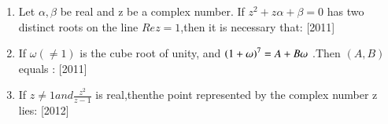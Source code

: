 \documentclass[journal,12pt,twocolumn,article]{IEEEtran}
\theoremstyle{remark}
\begin{document}
\begin{enumerate}[start = 14]
\item Let $\alpha,\beta$ be real and z be a complex number. If $z^2 +z\alpha +\beta =0$  has two distinct roots on the line $Rez=1$,then it is necessary that:
\hfill{[2011]}
\begin{enumerate}
\end{enumerate}

\item If $\omega(\neq1)$ is the cube root of unity, and $\left(1+\omega \right)^7= A+ B\omega$ .Then $(A,B)$ equals :
\hfill{[2011]}                                     

\begin{enumerate}                                  
\end{enumerate}

\item If $z \neq 1 and \frac{z^2}{z-1}$ is real,thenthe point represented by the complex number z lies:
\hfill{[2012]}


\end{enumerate}
\end{document}
